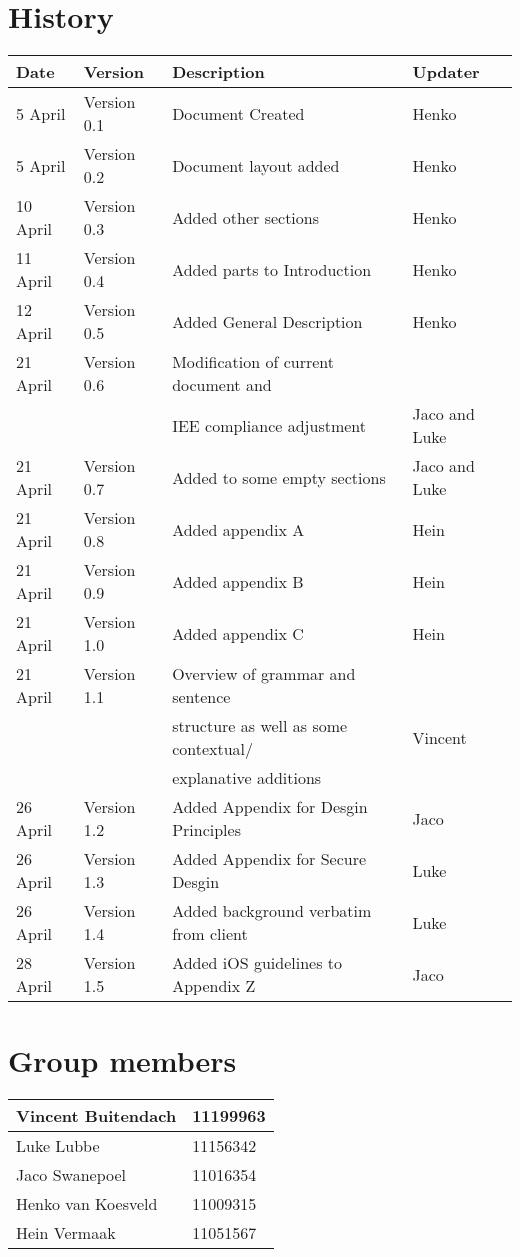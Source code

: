 
\section{History}

\begin{center}

\begin{tabular}{|l|l|l|l|}

\hline
Date & Version & Description&Updater\\ 
\hline
5 April& Version 0.1 & Document Created&Henko\\ 
\hline
5 April& Version 0.2 & Document layout added&Henko\\ 
\hline
10 April & Version 0.3 & Added other sections&Henko\\ 
\hline
11 April & Version 0.4 & Added parts to Introduction&Henko\\ 
\hline
12 April & Version 0.5 & Added General Description&Henko\\ 
\hline
21 April & Version 0.6 & Modification of current document and&\\
&& IEE compliance adjustment&Jaco and Luke\\ 
\hline
21 April & Version 0.7 & Added to some empty sections &Jaco and Luke\\ 
\hline
21 April & Version 0.8 & Added appendix A&Hein\\ 
\hline
21 April & Version 0.9 & Added appendix B&Hein\\ 
\hline
21 April & Version 1.0 & Added appendix C&Hein\\ 
\hline
21 April & Version 1.1 & Overview of grammar and sentence&\\ 
			&& structure as well as some contextual/&Vincent\\
			&&explanative additions & \\
\hline
26 April & Version 1.2 & Added Appendix for Desgin Principles& Jaco\\
\hline
26 April & Version 1.3 & Added Appendix for Secure Desgin& Luke\\
\hline
26 April & Version 1.4 & Added background verbatim from client& Luke\\
\hline
28 April & Version 1.5 & Added iOS guidelines to Appendix Z& Jaco\\
\hline

\end{tabular}

\vfill
\section{Group members}

\begin{tabular}{|l|l|}

\hline
Vincent Buitendach & 11199963\\
\hline
Luke Lubbe & 11156342\\
\hline
Jaco Swanepoel & 11016354\\
\hline
Henko van Koesveld & 11009315\\
\hline
Hein Vermaak & 11051567\\
\hline

\end{tabular}

\end{center}

